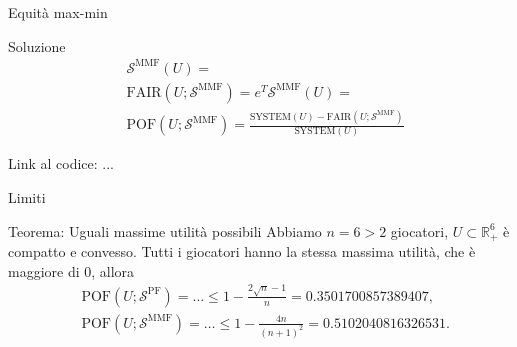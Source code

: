 \documentclass{beamer}
\begin{document}
\begin{frame}{Equità max-min}
	\begin{block}{Soluzione}
		\vspace{-0.7cm}
		\begin{equation}
			\begin{split}
				& \mathcal{S}^{\text{MMF}}(U) = \\
				& \text{FAIR}(U;\mathcal{S}^{\text{MMF}}) = e^T \mathcal{S}^{\text{MMF}}(U) = \\
				& \text{POF}(U;\mathcal{S}^{\text{MMF}}) = \frac{\text{SYSTEM}(U) - \text{FAIR}(U;\mathcal{S}^{\text{MMF}})}{\text{SYSTEM}(U)}
			\end{split}
		\end{equation}
		\vspace{-0.4cm}
	\end{block}
	Link al codice: ...
\end{frame}

\begin{frame}{Limiti}
	\begin{block}{Teorema: Uguali massime utilità possibili}
		Abbiamo $ n = 6 > 2$ giocatori, $U \subset \mathbb{R}^6_+$ è compatto e convesso. Tutti i giocatori hanno la stessa massima utilità, che è maggiore di 0, allora
		\begin{equation}
			\begin{split}
				& \text{POF}(U;\mathcal{S}^{\text{PF}}) = \dots \le 1 - \frac{2\sqrt{n}-1}{n} = 0.3501700857389407, \\ 
				& \text{POF}(U;\mathcal{S}^{\text{MMF}}) = \dots \le 1 - \frac{4n}{(n+1)^2} = 0.5102040816326531. 
			\end{split}
		\end{equation}
	\end{block}
\end{frame}
\end{document}
